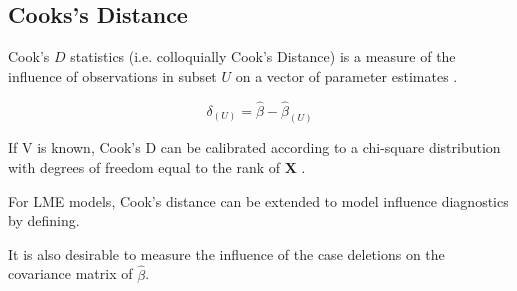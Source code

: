 \documentclass[12pt, a4paper]{report}
\theoremstyle{plain}
\theoremstyle{definition}
\theoremstyle{remark}
\begin{document}
\subsection{Cooks's Distance}%
 Cook's $D$ statistics (i.e. colloquially Cook's Distance) is a measure of the influence of observations in subset $U$ on a vector of parameter estimates \citep{cook77}.

\[ \delta_{(U)} = \hat{\beta} - \hat{\beta}_{(U)}\]

If V is known, Cook's D can be calibrated according to a chi-square distribution with degrees of freedom equal to the rank of $\boldsymbol{X}$ \citep{cpj92}.


For LME models, Cook's distance can be extended to model influence diagnostics by defining.


It is also desirable to measure the influence of the case deletions on the covariance matrix of $\hat{\beta}$.
\end{document}
